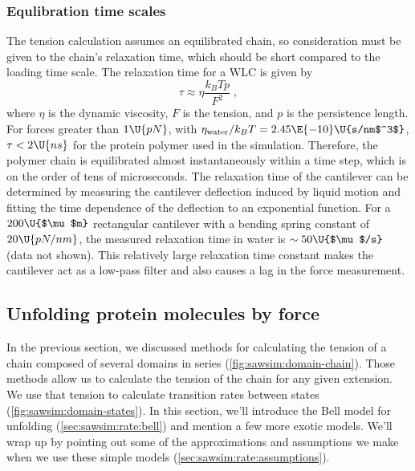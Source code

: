 \subsubsection{Equlibration time scales}
\label{sec:sawsim:timescales}

The tension calculation assumes an equilibrated chain, so
consideration must be given to the chain's relaxation time, which
should be short compared to the loading time scale.  The relaxation
time for a WLC is given by
\begin{equation}
 \tau \approx \eta \frac{k_BT p}{F^2}
   \;, \label{eq:sawsim:tau-wlc}
\end{equation}
where $\eta$ is the dynamic viscosity, $F$ is the tension, and $p$ is
the persistence length\citep{evans99}.  For forces greater than
$1\U{pN}$, with $\eta_\text{water}/k_BT=2.45\E{-10}\U{s/nm$^3$}$,
$\tau<2\U{ns}$ for the protein polymer used in the simulation.
Therefore, the polymer chain is equilibrated almost instantaneously
within a time step, which is on the order of tens of microseconds.
The relaxation time of the cantilever can be determined by measuring
the cantilever deflection induced by liquid motion and fitting the
time dependence of the deflection to an exponential
function\citep{jones05}.  For a $200\U{$\mu$m}$ rectangular cantilever
with a bending spring constant of $20\U{pN/nm}$, the measured
relaxation time in water is $\sim50\U{$\mu$/s}$ (data not shown).
This relatively large relaxation time constant makes the cantilever
act as a low-pass filter and also causes a lag in the force
measurement.
%

\subsection{Unfolding protein molecules by force}
\label{sec:sawsim:rate}

In the previous section, we discussed methods for calculating the
tension of a chain composed of several domains in series
(\cref{fig:sawsim:domain-chain}).  Those methods allow us to calculate
the tension of the chain for any given extension.  We use that tension
to calculate transition rates between states
(\cref{fig:sawsim:domain-states}).  In this section, we'll introduce
the Bell model for unfolding (\cref{sec:sawsim:rate:bell}) and mention
a few more exotic models.  We'll wrap up by pointing out some of the
approximations and assumptions we make when we use these simple models
(\cref{sec:sawsim:rate:assumptions}).

